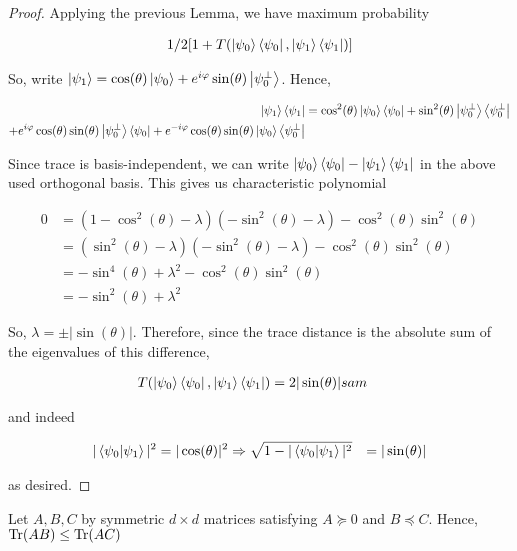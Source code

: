 \documentclass[main.tex]{subfiles}
\begin{document}
{\begin{subappendices}
\begin{proof}
Applying the previous Lemma, we have maximum probability

\begin{align*}
1/2[1 + T(\ket{\psi_0}\bra{\psi_0}, \ket{\psi_1}\bra{\psi_1}	)]
\end{align*}

So, write $\ket{\psi_1} = \cos(\theta) \ket{\psi_0} + e^{i\varphi}\sin(\theta)\ket{\psi_0^\perp}$. Hence,

\begin{align*}
\ket{\psi_1}\bra{\psi_1}	 &= \cos^2(\theta) \ket{\psi_0}\bra{\psi_0} + \sin^2(\theta)\ket{\psi_0^\perp}\bra{\psi_0^\perp}\\ 
+ e^{i\varphi}\cos(\theta)\sin(\theta)\ket{\psi_0^\perp}\bra{\psi_0} + e^{-i\varphi}\cos(\theta)\sin(\theta)\ket{\psi_0}\bra{\psi_0^\perp}
\end{align*}

Since trace is basis-independent, we can write $\ket{\psi_0}\bra{\psi_0} - \ket{\psi_1}\bra{\psi_1}$ in the above used orthogonal basis. This gives us characteristic polynomial

\begin{align*}
	0 &= (1-\cos^2(\theta) - \lambda)(-\sin^2(\theta) - \lambda) - \cos^2(\theta)\sin^2(\theta)\\
	&= (\sin^2(\theta) - \lambda)(-\sin^2(\theta) - \lambda) - \cos^2(\theta)\sin^2(\theta) \\
	&= -\sin^4(\theta) + \lambda^2 - \cos^2(\theta)\sin^2(\theta) \\
	&= -\sin^2(\theta) + \lambda^2
\end{align*}

 So, $\lambda = \pm |\sin(\theta)|$. Therefore, since the trace distance is the absolute sum of the eigenvalues of this difference, 

\begin{align*}
T(\ket{\psi_0}\bra{\psi_0}, \ket{\psi_1}\bra{\psi_1}	) &= 2|\sin(\theta)|sam
\end{align*}

and indeed 

\begin{align*}
|\bra{\psi_0}\ket{\psi_1}|^2 &= |\cos(\theta)|^2
\Rightarrow \sqrt{1 - |\bra{\psi_0}\ket{\psi_1}|^2} &= |\sin(\theta)|
\end{align*}

as desired.
\end{proof}


\begin{lemma}
\label{lem:psd-trace}
Let $A, B, C$ by symmetric $d \times d$ matrices satisfying $A \succeq 0$ and $B \preceq C$. Hence, $\Tr(AB) \leq \Tr(AC)$


\end{lemma}
\end{subappendices}}
\end{document}
